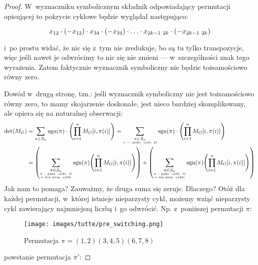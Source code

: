 \begin{proof}
	W~wyznaczniku symbolicznym składnik odpowiadający permutacji opisującej to pokrycie cyklowe będzie wyglądał następująco:

	\begin{equation*}
		x_{12} \cdot \left(-x_{12}\right) \cdot x_{34} \cdot \left(-x_{34}\right) \cdot \ldots \cdot x_{2k - 1\ 2k} \cdot \left(-x_{2k - 1\ 2k}\right)
	\end{equation*}

	i~po prostu widać, że nic się z~tym nie zredukuje, bo są tu tylko transpozycje, więc jeśli nawet je odwrócimy to nic się nie zmieni --- w~szczególności znak tego wyrażenia. Zatem faktycznie wyznacznik symboliczny nie będzie tożsamościowo równy zero.

	Dowód w~drugą stronę, tzn.: jeśli wyznacznik symboliczny nie jest tożsamościowo równy zero, to mamy skojarzenie  doskonałe, jest nieco bardziej skomplikowany, ale opiera się na naturalnej obserwacji:
	\begin{equation*}
		\begin{split}
			\det\pars{M_G}
			&= \sum_{\pi \in S_n}\sgn\pars{\pi} \cdot \pars{\prod_{i = 1}^{n}M_G[i, \pi\pars{i}]}
			= \sum_{\substack{\pi \in S_n\\\text{\tiny $\pi$ --- pokr. cykl. $G$}}}\sgn\pars{\pi} \cdot \pars{\prod_{i = 1}^{n}M_G[i, \pi\pars{i}]}\\
			&= \pars{\sum_{\substack{\pi \in S_n\\\text{\tiny $\pi$ -- pokr. cykl. $G$}\\\text{\tiny $\pi$ bez niep. cykli}}}\sgn\pars{\pi}\pars{\prod_{i = 1}^{n}M_G[i, \pi\pars{i}]}} + \pars{\sum_{\substack{\pi \in S_n\\\text{\tiny $\pi$ -- pokr. cykl. \(G\)}\\\text{\tiny $\pi$ ma niep. cykle}}}\sgn\pars{\pi}\pars{\prod_{i = 1}^{n}M_G[i, \pi\pars{i}]}}
		\end{split}
	\end{equation*}
	Jak nam to pomaga? Zauważmy, że druga suma się zeruje. Dlaczego? Otóż dla każdej permutacji, w~której istnieje nieparzysty cykl, możemy wziąć nieparzysty cykl zawierający najmniejszą liczbą i~go odwrócić. Np. z~poniższej permutacji \(\pi\):

	\begin{figure}[H]
		\centering
		\texttt{[image: images/tutte/pre\_switching.png]}
		\caption{Permutacja \(\pi = (1, 2)(3, 4, 5)(6, 7, 8)\)}
	\end{figure}

	powstanie permutacja \(\pi'\):


\end{proof}
